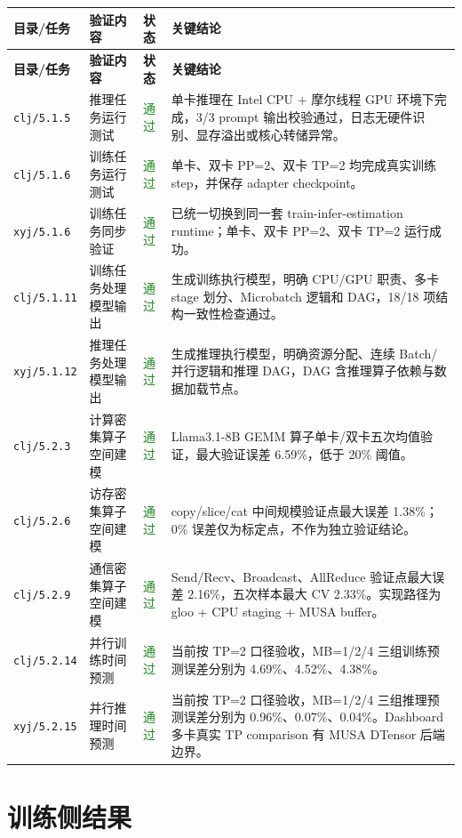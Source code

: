 \documentclass[UTF8,a4paper,11pt]{ctexart}
\newcommand{\pass}{\textcolor{ForestGreen}{通过}}
\begin{document}
\begin{longtable}{p{2.2cm}p{4.2cm}p{2cm}p{7.2cm}}
\toprule
\textbf{目录/任务} & \textbf{验证内容} & \textbf{状态} & \textbf{关键结论} \\
\midrule
\endfirsthead
\toprule
\textbf{目录/任务} & \textbf{验证内容} & \textbf{状态} & \textbf{关键结论} \\
\midrule
\endhead
\texttt{clj/5.1.5} & 推理任务运行测试 & \pass & 单卡推理在 Intel CPU + 摩尔线程 GPU 环境下完成，3/3 prompt 输出校验通过，日志无硬件识别、显存溢出或核心转储异常。 \\
\texttt{clj/5.1.6} & 训练任务运行测试 & \pass & 单卡、双卡 PP=2、双卡 TP=2 均完成真实训练 step，并保存 adapter checkpoint。 \\
\texttt{xyj/5.1.6} & 训练任务同步验证 & \pass & 已统一切换到同一套 train-infer-estimation runtime；单卡、双卡 PP=2、双卡 TP=2 运行成功。 \\
\texttt{clj/5.1.11} & 训练任务处理模型输出 & \pass & 生成训练执行模型，明确 CPU/GPU 职责、多卡 stage 划分、Microbatch 逻辑和 DAG，18/18 项结构一致性检查通过。 \\
\texttt{xyj/5.1.12} & 推理任务处理模型输出 & \pass & 生成推理执行模型，明确资源分配、连续 Batch/并行逻辑和推理 DAG，DAG 含推理算子依赖与数据加载节点。 \\
\texttt{clj/5.2.3} & 计算密集算子空间建模 & \pass & Llama3.1-8B GEMM 算子单卡/双卡五次均值验证，最大验证误差 6.59\%，低于 20\% 阈值。 \\
\texttt{clj/5.2.6} & 访存密集算子空间建模 & \pass & copy/slice/cat 中间规模验证点最大误差 1.38\%；0\% 误差仅为标定点，不作为独立验证结论。 \\
\texttt{clj/5.2.9} & 通信密集算子空间建模 & \pass & Send/Recv、Broadcast、AllReduce 验证点最大误差 2.16\%，五次样本最大 CV 2.33\%。实现路径为 gloo + CPU staging + MUSA buffer。 \\
\texttt{clj/5.2.14} & 并行训练时间预测 & \pass & 当前按 TP=2 口径验收，MB=1/2/4 三组训练预测误差分别为 4.69\%、4.52\%、4.38\%。 \\
\texttt{xyj/5.2.15} & 并行推理时间预测 & \pass & 当前按 TP=2 口径验收，MB=1/2/4 三组推理预测误差分别为 0.96\%、0.07\%、0.04\%。Dashboard 多卡真实 TP comparison 有 MUSA DTensor 后端边界。 \\
\bottomrule
\end{longtable}

\section{训练侧结果}
\end{document}
